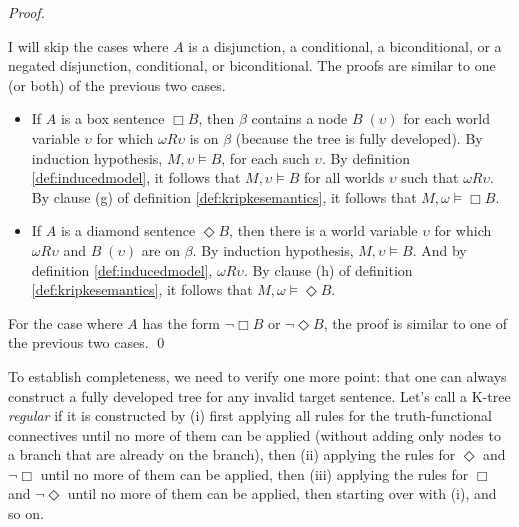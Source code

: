 \begin{proof}
\begin{itemize}
  \end{itemize} 
  
  I will skip the cases where $A$ is a disjunction, a conditional, a
  biconditional, or a negated disjunction, conditional, or biconditional. The
  proofs are similar to one (or both) of the previous two cases.

  \begin{itemize}
    
    \item If $A$ is a box sentence $\Box B$, then $\beta$ contains a node
          $B \;(\upsilon)$ for each world variable $\upsilon$ for which
          $\omega R \upsilon$ is on $\beta$ (because the tree is fully
          developed). By induction hypothesis, $M, \upsilon \models B$, for each
          such $\upsilon$. By definition \ref{def:inducedmodel}, it follows that
          $M,\upsilon \models B$ for all worlds $\upsilon$ such that
          $\omega R \upsilon$. By clause (g) of definition
          \ref{def:kripkesemantics}, it follows that $M, \omega \models \Box B$.
    
    \item If $A$ is a diamond sentence $\Diamond B$, then there is a world
          variable $\upsilon$ for which $\omega R \upsilon$ and $B \;(\upsilon)$
          are on $\beta$. By induction hypothesis, $M, \upsilon \models B$. And
          by definition \ref{def:inducedmodel}, $\omega R\upsilon$. By clause
          (h) of definition \ref{def:kripkesemantics}, it follows that
          $M, \omega \models \Diamond B$.

  \end{itemize}

  For the case where $A$ has the form $\neg \Box B$ or $\neg \Diamond B$, the
  proof is similar to one of the previous two cases. \qed
  
\end{proof}
\medskip

To establish completeness, we need to verify one more point: that one can always
construct a fully developed tree for any invalid target sentence. Let's call a
K-tree \emph{regular} if it is constructed by (i) first applying all rules for
the truth-functional connectives until no more of them can be applied (without
adding only nodes to a branch that are already on the branch), then (ii)
applying the rules for $\Diamond$ and $\neg \Box$ until no more of them can be
applied, then (iii) applying the rules for $\Box$ and $\neg \Diamond$ until no
more of them can be applied, then starting over with (i), and so on.

